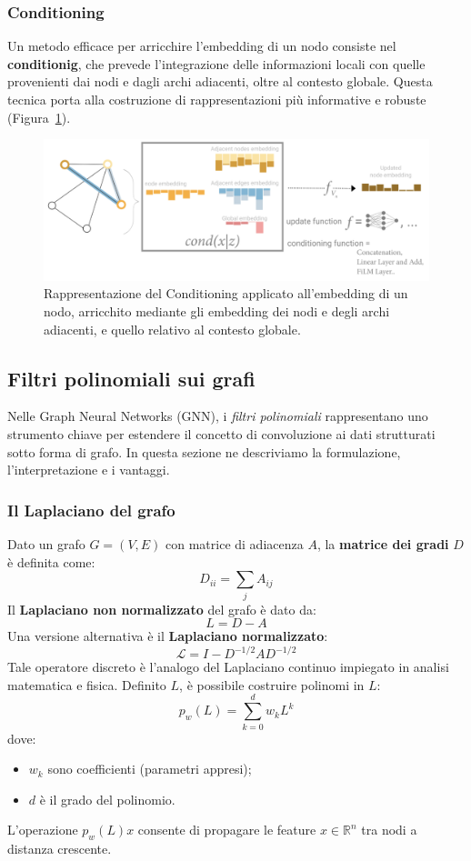\subsubsection{Conditioning}

Un metodo efficace per arricchire l'embedding di un nodo consiste nel \textbf{conditionig}, che prevede l'integrazione delle informazioni locali con quelle provenienti dai nodi e dagli archi adiacenti, oltre al contesto globale. Questa tecnica porta alla costruzione di rappresentazioni più informative e robuste (Figura~\ref{fig:condit}).

\begin{figure}
    \centering
    \includegraphics[width=\textwidth]{figure/Conditioning.png}
    \caption{Rappresentazione del Conditioning applicato all'embedding di un nodo, arricchito mediante gli embedding dei nodi e degli archi adiacenti, e quello relativo al contesto globale.}
    \label{fig:condit}
\end{figure}

\subsection{Filtri polinomiali sui grafi}

Nelle Graph Neural Networks (GNN), i \textit{filtri polinomiali} rappresentano uno strumento chiave per estendere il concetto di convoluzione ai dati strutturati sotto forma di grafo. In questa sezione ne descriviamo la formulazione, l’interpretazione e i vantaggi.

\subsubsection{Il Laplaciano del grafo}

Dato un grafo \( G = (V, E) \) con matrice di adiacenza \( A \), la \textbf{matrice dei gradi} \( D \) è definita come:
\[
  D_{ii} = \sum_{j} A_{ij}
\]
Il \textbf{Laplaciano non normalizzato} del grafo è dato da:
\[
  L = D - A
\]
Una versione alternativa è il \textbf{Laplaciano normalizzato}:
\[
  \mathcal{L} = I - D^{-1/2} A D^{-1/2}
\]
Tale operatore discreto è l’analogo del Laplaciano continuo impiegato in analisi matematica e fisica. Definito \( L \), è possibile costruire polinomi in \( L \):
\[
  p_w(L) = \sum_{k=0}^d w_k L^k
\]
dove:
\begin{itemize}
  \item \( w_k \) sono coefficienti (parametri appresi);
  \item \( d \) è il grado del polinomio.
\end{itemize}
L’operazione \( p_w(L) x \) consente di propagare le feature \( x \in \mathbb{R}^n \) tra nodi a distanza crescente.

